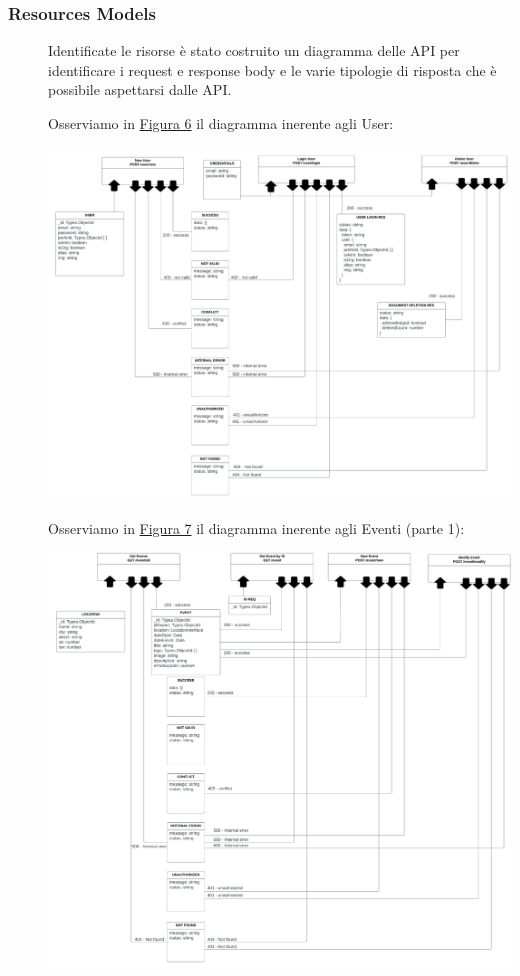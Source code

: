 \documentclass{article}
\begin{document}
\subsubsection{Resources Models}
\begin{description}
    \item[] Identificate le risorse è stato costruito un diagramma delle API per identificare i request e response body e le varie tipologie di risposta che è possibile aspettarsi dalle API.
        \clearpage
    \item[] Osserviamo in \hyperref[img:6]{Figura 6} il diagramma inerente agli User:
    \item[] \label{img:6} \begin{center}
            \includegraphics[scale=0.9]{userResources.png}
        \end{center}
        \clearpage
    \item[] Osserviamo in \hyperref[img:7]{Figura 7} il diagramma inerente agli Eventi (parte 1):
    \item[] \label{img:7} \begin{center}
            \includegraphics[scale=0.9]{eventResources1.png}

\end{center}
\end{description}
\end{document}
